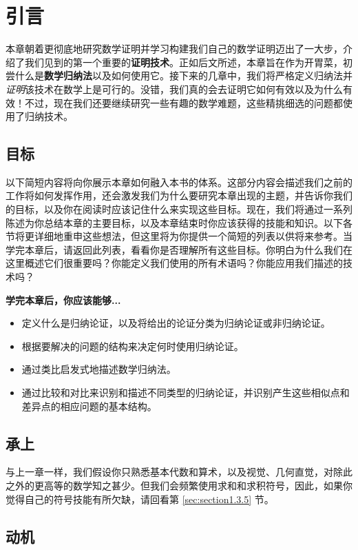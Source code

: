 \section{引言}

本章朝着更彻底地研究数学证明并学习构建我们自己的数学证明迈出了一大步，介绍了我们见到的第一个重要的\textbf{证明技术}。正如后文所述，本章旨在作为开胃菜，初尝什么是\textbf{数学归纳法}以及如何使用它。接下来的几章中，我们将严格定义归纳法并\emph{证明}该技术在数学上是可行的。没错，我们真的会去证明它如何有效以及为什么有效！不过，现在我们还要继续研究一些有趣的数学难题，这些精挑细选的问题都使用了归纳技术。

\subsection{目标}

以下简短内容将向你展示本章如何融入本书的体系。这部分内容会描述我们之前的工作将如何发挥作用，还会激发我们为什么要研究本章出现的主题，并告诉你我们的目标，以及你在阅读时应该记住什么来实现这些目标。现在，我们将通过一系列陈述为你总结本章的主要目标，以及本章结束时你应该获得的技能和知识。以下各节将更详细地重申这些想法，但这里将为你提供一个简短的列表以供将来参考。当学完本章后，请返回此列表，看看你是否理解所有这些目标。你明白为什么我们在这里概述它们很重要吗？你能定义我们使用的所有术语吗？你能应用我们描述的技术吗？

\textbf{学完本章后，你应该能够...}

\begin{itemize}
    \item 定义什么是归纳论证，以及将给出的论证分类为归纳论证或非归纳论证。
    \item 根据要解决的问题的结构来决定何时使用归纳论证。
    \item 通过类比启发式地描述数学归纳法。
    \item 通过比较和对比来识别和描述不同类型的归纳论证，并识别产生这些相似点和差异点的相应问题的基本结构。
\end{itemize}

\subsection{承上}

与上一章一样，我们假设你只熟悉基本代数和算术，以及视觉、几何直觉，对除此之外的更高等的数学知之甚少。但我们会频繁使用求和和求积符号，因此，如果你觉得自己的符号技能有所欠缺，请回看第 \ref{sec:section1.3.5} 节。

\subsection{动机}

